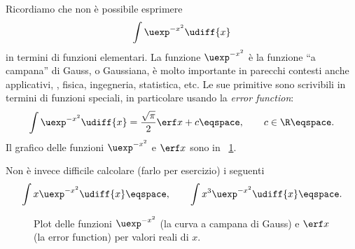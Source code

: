 \begin{Exercise}
Ricordiamo che non \`e possibile esprimere
\begin{displaymath}
\int \uexp^{-x^{2}} \udiff{x}
\end{displaymath}
in termini di funzioni elementari.%
\footnotemark
La funzione $\uexp^{-x^{2}}$ \`e la funzione
``a campana'' di Gauss, o Gaussiana, \`e molto importante in parecchi contesti
anche applicativi, \eg,
fisica, ingegneria, statistica, etc. Le sue primitive sono scrivibili in termini di
funzioni speciali, in particolare usando la \emph{error function}:
\begin{displaymath}
\int \uexp^{-x^{2}} \udiff{x} = \frac{\sqrt{\pi}}{2} \erf x + c \eqspace ,
\qquad c\in\R \eqspace.
\end{displaymath}
Il grafico delle funzioni $\uexp^{-x^{2}}$ e $\erf x$  sono in
\figurename~\ref{fig:plot_gauss}.
\par
Non \`e invece difficile calcolare (farlo per esercizio) i seguenti
\begin{displaymath}
\int x \uexp^{-x^{2}} \udiff{x}  \eqspace, \qquad 
\int x^{3} \uexp^{-x^{2}} \udiff{x} \eqspace .
\end{displaymath}
\end{Exercise}
\begin{figure}
\centering
\caption{Plot delle funzioni $\uexp^{-x^{2}}$ (la curva a campana di Gauss) e
$\erf x $ (la error function) per valori reali di $x$.\label{fig:plot_gauss}}
\end{figure}
